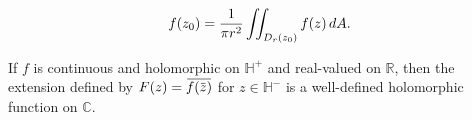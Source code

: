 \begin{theorem}

\begin{align*}
f(z_0) = {1\over \pi r^2} \iint_{D_r(z_0)} f(z)\, dA
.\end{align*}

\end{theorem}

\begin{theorem}\label{SchwarzReflection}

If \(f\) is continuous and holomorphic on \({\mathbb{H}}^+\) and
real-valued on \({\mathbb{R}}\), then the extension defined by
\(F(z) = \mkern 1.5mu\overline{\mkern-1.5muf(\mkern 1.5mu\overline{\mkern-1.5muz\mkern-1.5mu}\mkern 1.5mu)\mkern-1.5mu}\mkern 1.5mu\)
for \(z\in {\mathbb{H}}^-\) is a well-defined holomorphic function on
\({\mathbb{C}}\).

\end{theorem}

